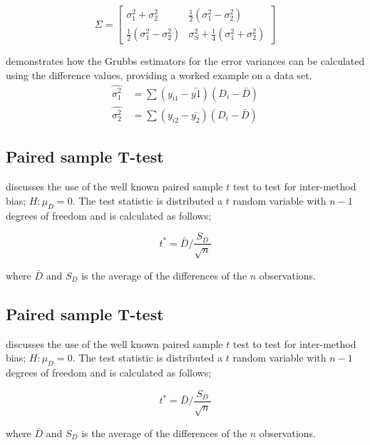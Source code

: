 \documentclass[12pt, a4paper]{article}
\begin{document}
\begin{equation}
\Sigma = \left[\begin{matrix}
\sigma^{2}_{1}+\sigma^{2}_{2}&\frac{1}{2}(\sigma^{2}_{1}-\sigma^{2}_{2})\\
\frac{1}{2}(\sigma^{2}_{1}-\sigma^{2}_{2})&\sigma^{2}_{S}+
\frac{1}{4}(\sigma^{2}_{1}+\sigma^{2}_{2})
\end{matrix} \right]
\end{equation}





\citet{Kinsella} demonstrates how the Grubbs estimators for the
error variances can be calculated using the difference values,
providing a worked example on a data set.
\begin{eqnarray}
\hat{\sigma^{2}_{1}}
\quad=\sum{(y_{i1}-\bar{y{1}})(D_{i}-\bar{D})}\\
\hat{\sigma^{2}_{2}} \quad=
\sum{(y_{i2}-\bar{y_{2}})(D_{i}-\bar{D})} \nonumber
\end{eqnarray}

\subsection{Paired sample T-test} \citet{Bartko} discusses the use
of the well known paired sample $t$ test to test for inter-method
bias; $H: \mu_{D}=0$. The test statistic is distributed a $t$
random variable with $n-1$ degrees of freedom and is calculated as
follows;

\begin{equation}
t^{*} = \bar{D}/ \frac{S_{D}}{\sqrt{n}}
\end{equation}

where $\bar{D}$ and $S_{D}$ is the average of the differences of
the $n$ observations.



\subsection{Paired sample T-test} \citet{Bartko} discusses the use
of the well known paired sample $t$ test to test for inter-method
bias; $H: \mu_{D}=0$. The test statistic is distributed a $t$
random variable with $n-1$ degrees of freedom and is calculated as
follows;

\begin{equation}
	t^{*} = \bar{D}/ \frac{S_{D}}{\sqrt{n}}
\end{equation}

where $\bar{D}$ and $S_{D}$ is the average of the differences of
the $n$ observations.
\end{document}
